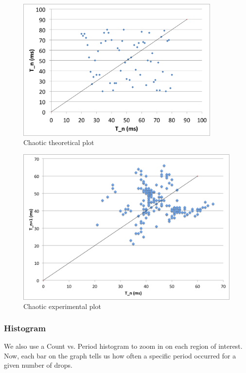 \documentclass[11pt]{article}
\begin{document}
\begin{figure}[htp]
\begin{center}
\includegraphics[width=4in]{figs/chaotic_th}
\caption{ Chaotic theoretical plot}
\label{chaotic_th}
\end{center}
\end{figure}


\newpage
\begin{figure}[htp]
\begin{center}
\includegraphics[width=6in]{figs/chaotic}
\caption{ Chaotic experimental plot}
\label{chaotic_exp}
\end{center}
\end{figure}

\newpage
\subsubsection{Histogram}
We also use a Count vs. Period histogram to zoom in on each region of interest. Now, each bar on the graph tells us how often a specific period occurred for a given number of drops.
\end{document}
